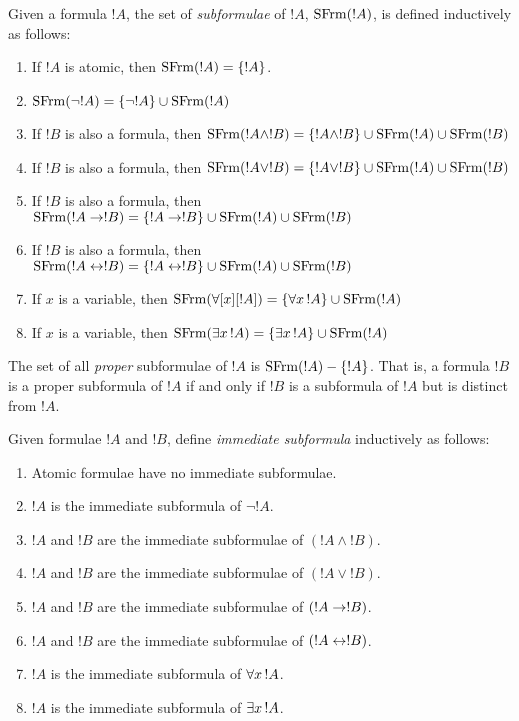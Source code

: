\documentclass[syntax-and-semantics]{subfiles}
\begin{document}
\begin{defn}[Subformula]
Given a formula $!A$, the set of \emph{subformulae} of $!A$,
$\mathrm{SFrm}({!A})$, is defined inductively as follows:
\begin{enumerate}
\item If $!A$ is atomic, then $\mathrm{SFrm}({!A}) = \{!A\}$.
\item $\mathrm{SFrm}({\lnot !A}) = \{\lnot !A\} \cup \mathrm{SFrm}({!A})$
\item If $!B$ is also a formula, then $\mathrm{SFrm}({!A \land !B}) = \{!A \land !B\} \cup \mathrm{SFrm}({!A}) \cup \mathrm{SFrm}({!B})$
\item If $!B$ is also a formula, then $\mathrm{SFrm}({!A \lor !B}) = \{!A \lor !B\} \cup \mathrm{SFrm}({!A}) \cup \mathrm{SFrm}({!B})$
\item If $!B$ is also a formula, then $\mathrm{SFrm}({!A \to !B}) = \{!A \to !B\} \cup \mathrm{SFrm}({!A}) \cup \mathrm{SFrm}({!B})$
\item If $!B$ is also a formula, then $\mathrm{SFrm}({!A \leftrightarrow !B}) = \{!A \leftrightarrow !B\} \cup \mathrm{SFrm}({!A}) \cup \mathrm{SFrm}({!B})$
\item If $x$ is a variable, then $\SubFrm{\forall[x][!A]} = \{\lforall[x][!A]\} \cup \SubFrm{!A}$
\item If $x$ is a variable, then $\SubFrm{\lexists[x][!A]} = \{\lexists[x][!A]\} \cup \SubFrm{!A}$
\end{enumerate}
The set of all \emph{proper} subformulae of $!A$ is $\mathrm{SFrm}({!A}) -
\{!A\}$. That is, a formula $!B$ is a proper subformula of $!A$ if and
only if $!B$ is a subformula of $!A$ but is distinct from $!A$.
\end{defn}

\begin{defn}
Given formulae $!A$ and $!B$, define \emph{immediate subformula} inductively as follows:
\begin{enumerate}
\item Atomic formulae have no immediate subformulae.
\item $!A$ is the immediate subformula of $\lnot !A$.
\item $!A$ and $!B$ are the immediate subformulae of $(!A \land !B)$.
\item $!A$ and $!B$ are the immediate subformulae of $(!A \lor !B)$.
\item $!A$ and $!B$ are the immediate subformulae of $(!A \to !B)$.
\item $!A$ and $!B$ are the immediate subformulae of $(!A \leftrightarrow !B)$.
\item $!A$ is the immediate subformula of $\lforall[x][!A]$.
\item $!A$ is the immediate subformula of $\lexists[x][!A]$.
\end{enumerate}
\end{defn}
\end{document}
